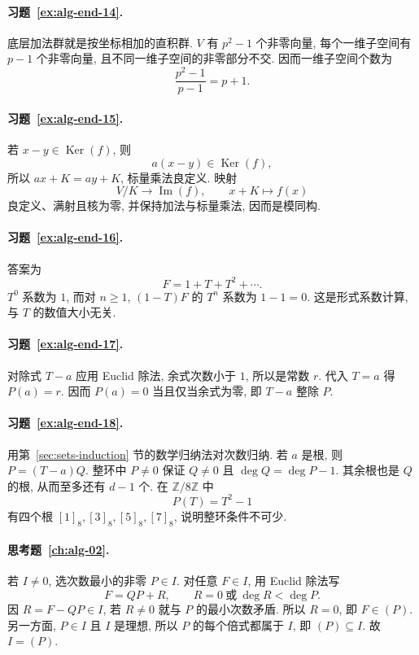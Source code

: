 \documentclass[usesamecnt, thmcnt=section, lang=cn, newtx, 10pt, scheme=chinese]{elegantbook}
\begin{document}
\paragraph*{习题~\ref{ex:alg-end-14}.}
底层加法群就是按坐标相加的直积群. $V$ 有 $p^2-1$ 个非零向量, 每个一维子空间有 $p-1$ 个非零向量, 且不同一维子空间的非零部分不交. 因而一维子空间个数为
\[
 \frac{p^2-1}{p-1}=p+1.
\]

\paragraph*{习题~\ref{ex:alg-end-15}.}
若 $x-y\in\operatorname{Ker}(f)$, 则
\[
 a(x-y)\in\operatorname{Ker}(f),
\]
所以 $ax+K=ay+K$, 标量乘法良定义. 映射
\[
 V/K\to\operatorname{Im}(f),
 \qquad x+K\mapsto f(x)
\]
良定义、满射且核为零, 并保持加法与标量乘法, 因而是模同构.

\paragraph*{习题~\ref{ex:alg-end-16}.}
答案为
\[
 F=1+T+T^2+\cdots.
\]
$T^0$ 系数为 $1$, 而对 $n\geq1$, $(1-T)F$ 的 $T^n$ 系数为 $1-1=0$. 这是形式系数计算, 与 $T$ 的数值大小无关.

\paragraph*{习题~\ref{ex:alg-end-17}.}
对除式 $T-a$ 应用 Euclid 除法, 余式次数小于 $1$, 所以是常数 $r$. 代入 $T=a$ 得 $P(a)=r$. 因而 $P(a)=0$ 当且仅当余式为零, 即 $T-a$ 整除 $P$.

\paragraph*{习题~\ref{ex:alg-end-18}.}
用第~\ref{sec:sets-induction} 节的数学归纳法对次数归纳. 若 $a$ 是根, 则 $P=(T-a)Q$. 整环中 $P\neq0$ 保证 $Q\neq0$ 且 $\deg Q=\deg P-1$. 其余根也是 $Q$ 的根, 从而至多还有 $d-1$ 个. 在 $\mathbb Z/8\mathbb Z$ 中
\[
 P(T)=T^2-1
\]
有四个根 $[1]_8,[3]_8,[5]_8,[7]_8$, 说明整环条件不可少.

\paragraph*{思考题~\ref{ch:alg-02}.}
若 $I\neq0$, 选次数最小的非零 $P\in I$. 对任意 $F\in I$, 用 Euclid 除法写
\[
 F=QP+R,
 \qquad R=0\ \text{或}\ \deg R<\deg P.
\]
因 $R=F-QP\in I$, 若 $R\neq0$ 就与 $P$ 的最小次数矛盾. 所以 $R=0$, 即 $F\in(P)$. 另一方面, $P\in I$ 且 $I$ 是理想, 所以 $P$ 的每个倍式都属于 $I$, 即 $(P)\subseteq I$. 故 $I=(P)$.
\end{document}
